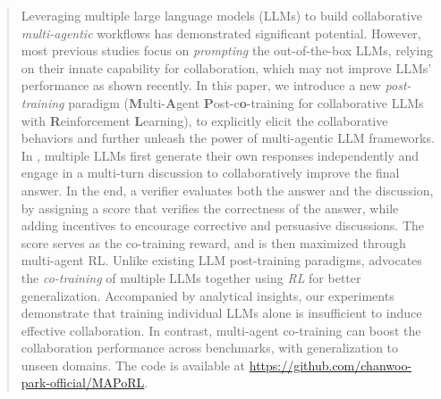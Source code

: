 \begin{abstract}
Leveraging multiple large language models (LLMs) to build collaborative  {\it multi-agentic} workflows has demonstrated significant potential. However, most previous studies focus on {\it prompting}  the out-of-the-box LLMs, relying on their innate capability for collaboration, which may not improve LLMs' performance as shown recently.
In this paper, we introduce a new {\it post-training} paradigm {\bf \ours} ({\bf M}ulti-{\bf A}gent {\bf P}ost-c{\bf o}-training for collaborative LLMs with {\bf R}einforcement {\bf L}earning), to explicitly elicit the collaborative behaviors and further unleash the power of multi-agentic LLM frameworks. 
In {\bf \ours}, multiple LLMs first generate their own responses independently and engage in a multi-turn discussion to collaboratively improve the final answer. 
In the end,  a  {\bf \ours} verifier evaluates both the answer and the discussion, by assigning a score that verifies the correctness of the  answer,  while  adding incentives to encourage corrective and persuasive discussions. The score serves as the co-training reward, and is then maximized through multi-agent RL.
Unlike existing LLM post-training paradigms, {\bf \ours} advocates the {\it co-training} of multiple LLMs together using {\it RL} for better generalization. Accompanied by analytical insights, our experiments demonstrate that training individual LLMs alone is insufficient to induce effective collaboration. In contrast, multi-agent co-training can boost  the collaboration performance across benchmarks, with generalization to unseen domains. The code is available at \url{https://github.com/chanwoo-park-official/MAPoRL}.



\end{abstract}